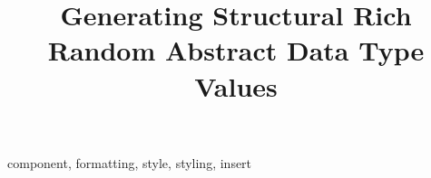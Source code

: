 \documentclass[conference, fleqn]{IEEEtran}
\begin{document}
\title{Generating Structural Rich \\ Random Abstract Data Type Values }

\author{
\and
{}
}

\maketitle


\newenvironment{CompactItemize}%
  {\begin{list}{$\, \  \blacktriangleright$}%
   {\leftmargin=0pt \itemsep=2pt \topsep=5pt
     \parsep=0pt \partopsep=0pt}}%
  {\end{list}}




\begin{IEEEkeywords}
component, formatting, style, styling, insert
\end{IEEEkeywords}












\end{document}
